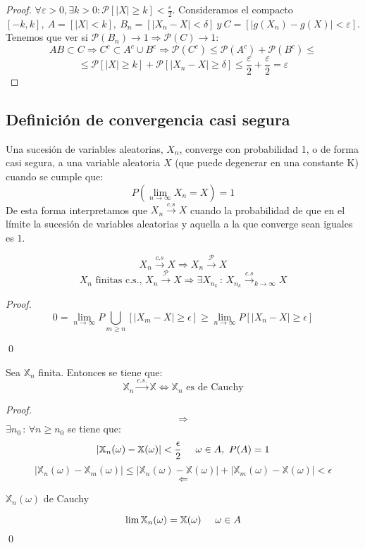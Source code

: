 \begin{proof}
$\forall \varepsilon > 0, \exists k>0 : \mathcal{P}[|X| \geq k] < \frac{\varepsilon}{2}$. Consideramos el compacto $[-k,k], \ A = [|X| < k], \ B_n = [|X_n - X| < \delta] \ y \ C = [|g(X_n) - g(X)| < \varepsilon]$. Tenemos que ver si $\mathcal{P}(B_n)\to 1 \Rightarrow \mathcal{P}(C)\to 1 $:
$$ AB \subset C \Rightarrow C^c \subset A^c \cup B^c \Rightarrow \mathcal{P}(C^c) \leq \mathcal{P}(A^c) + \mathcal{P}(B^c) \leq $$
$$ \leq \mathcal{P}[|X| \geq k] + \mathcal{P}[|X_n - X| \geq \delta] \leq \frac{\varepsilon}{2} + \frac{\varepsilon}{2} = \varepsilon$$
\end{proof}

\subsection{Definición de convergencia casi segura}

Una sucesión de variables aleatorias, ${ X_n }$, converge con probabilidad 1, o de forma casi segura, a una variable aleatoria $X$ (que puede degenerar en una constante K) cuando se cumple que:
$$P(\lim_{n\rightarrow\infty}X_n=X)=1$$
De esta forma interpretamos que $X_n\stackrel{c.s}{\longrightarrow}X$ cuando la probabilidad de que en el límite la sucesión de variables  aleatorias y aquella a la que converge sean iguales es $1$.

\begin{theorem}
$$X_n\stackrel{c.s}{\longrightarrow}X\Longrightarrow X_n\stackrel{\mathcal{P}}{\longrightarrow}X$$
$$X_n \text{ finitas c.s.,  }
X_n\stackrel{\mathcal{P}}{\longrightarrow}X
\Longrightarrow 
\exists X_{n_k}\,:\, X_{n_k}
\stackrel{c.s}{\longrightarrow}_{k\rightarrow\infty}X$$
\end{theorem}
\begin{proof}
$$0=\displaystyle\lim_{n\rightarrow\infty}P\bigcup_{m\geq n}[|X_m - X|\geq \epsilon ]\geq\displaystyle\lim_{n\rightarrow\infty}P[|X_n - X|\geq \epsilon ]$$

\qed
\end{proof}

\begin{lemma}
Sea $\mathbb{X}_n$ finita. Entonces se tiene que:
\\
$$\mathbb{X}_n \stackrel{c.s.}{\longrightarrow}\mathbb{X}\Longleftrightarrow \mathbb{X}_n \text{ es de Cauchy}$$
\end{lemma}
\begin{proof}
$$\Longrightarrow$$
$\exists n_0\, : \, \forall n\geq n_0$ se tiene que:
$$|\mathbb{X}_n(\omega)-\mathbb{X}(\omega)|<\frac{\epsilon}{2}
\hspace{0.5cm}  \omega \in A,\ P(A)=1$$
$$|\mathbb{X}_n(\omega)-\mathbb{X}_m(\omega)|\leq|\mathbb{X}_n(\omega)-\mathbb{X}(\omega)|+|\mathbb{X}_m(\omega)-\mathbb{X}(\omega)|<\epsilon$$
$$\Longleftarrow$$
\begin{center}
${\mathbb{X}_n(\omega)}$ de Cauchy
\end{center}
$$\lim\mathbb{X}_n(\omega)=\mathbb{X}(\omega)\hspace{0.5cm} \omega \in A$$
\qed
\end{proof}

